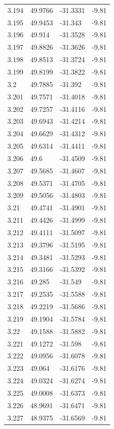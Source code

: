 \begin{tabular}{llll}
3.194 & 49.9766 & -31.3331 & -9.81 \\
3.195 & 49.9453 & -31.343 & -9.81 \\
3.196 & 49.914 & -31.3528 & -9.81 \\
3.197 & 49.8826 & -31.3626 & -9.81 \\
3.198 & 49.8513 & -31.3724 & -9.81 \\
3.199 & 49.8199 & -31.3822 & -9.81 \\
3.2 & 49.7885 & -31.392 & -9.81 \\
3.201 & 49.7571 & -31.4018 & -9.81 \\
3.202 & 49.7257 & -31.4116 & -9.81 \\
3.203 & 49.6943 & -31.4214 & -9.81 \\
3.204 & 49.6629 & -31.4312 & -9.81 \\
3.205 & 49.6314 & -31.4411 & -9.81 \\
3.206 & 49.6 & -31.4509 & -9.81 \\
3.207 & 49.5685 & -31.4607 & -9.81 \\
3.208 & 49.5371 & -31.4705 & -9.81 \\
3.209 & 49.5056 & -31.4803 & -9.81 \\
3.21 & 49.4741 & -31.4901 & -9.81 \\
3.211 & 49.4426 & -31.4999 & -9.81 \\
3.212 & 49.4111 & -31.5097 & -9.81 \\
3.213 & 49.3796 & -31.5195 & -9.81 \\
3.214 & 49.3481 & -31.5293 & -9.81 \\
3.215 & 49.3166 & -31.5392 & -9.81 \\
3.216 & 49.285 & -31.549 & -9.81 \\
3.217 & 49.2535 & -31.5588 & -9.81 \\
3.218 & 49.2219 & -31.5686 & -9.81 \\
3.219 & 49.1904 & -31.5784 & -9.81 \\
3.22 & 49.1588 & -31.5882 & -9.81 \\
3.221 & 49.1272 & -31.598 & -9.81 \\
3.222 & 49.0956 & -31.6078 & -9.81 \\
3.223 & 49.064 & -31.6176 & -9.81 \\
3.224 & 49.0324 & -31.6274 & -9.81 \\
3.225 & 49.0008 & -31.6373 & -9.81 \\
3.226 & 48.9691 & -31.6471 & -9.81 \\
3.227 & 48.9375 & -31.6569 & -9.81 \\

\end{tabular}
